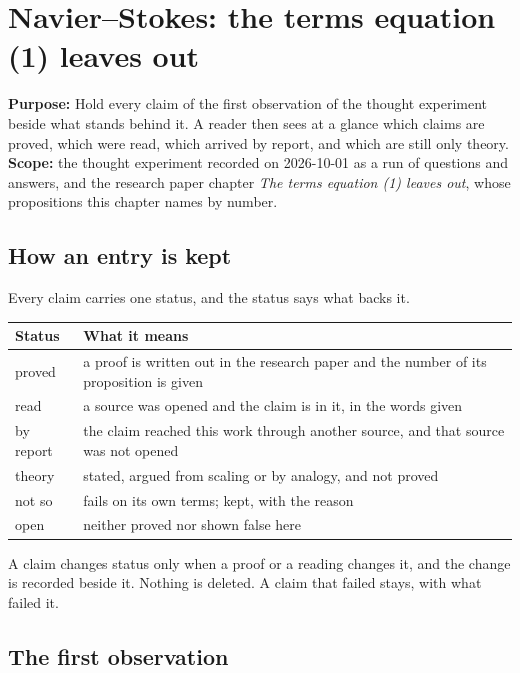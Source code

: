 \chapter{Navier--Stokes: the terms equation (1) leaves out}

\textbf{Purpose:} Hold every claim of the first observation of the thought experiment beside what
stands behind it. A reader then sees at a glance which claims are proved, which were read, which
arrived by report, and which are still only theory. \textbf{Scope:} the thought experiment recorded
on 2026-10-01 as a run of questions and answers, and the research paper chapter \emph{The terms
equation (1) leaves out}, whose propositions this chapter names by number.

\section{How an entry is kept}

Every claim carries one status, and the status says what backs it.

\begin{center}
\begin{tabular}{@{}p{}>{\raggedright\arraybackslash}p{}@{}}
\toprule
Status & What it means \\
\midrule
proved & a proof is written out in the research paper and the number of its proposition is given \\
read & a source was opened and the claim is in it, in the words given \\
by report & the claim reached this work through another source, and that source was not opened \\
theory & stated, argued from scaling or by analogy, and not proved \\
not so & fails on its own terms; kept, with the reason \\
open & neither proved nor shown false here \\
\bottomrule
\end{tabular}
\end{center}

A claim changes status only when a proof or a reading changes it, and the change is recorded
beside it. Nothing is deleted. A claim that failed stays, with what failed it.

\section{The first observation}

